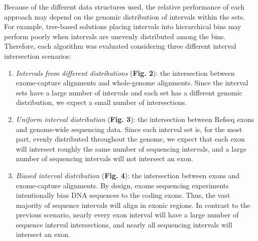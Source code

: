 \documentclass{bioinfo}
\begin{document}
	Because of the different data structures used, the relative performance of each 
	approach may depend on the genomic distribution of intervals within the sets.  For example, 
	tree-based solutions placing intervals into hierarchical bins may perform poorly when intervals are 
	unevenly distributed among the bins. Therefore, each algorithm was evaluated 
	considering three different interval intersection scenarios:

		\begin{enumerate}
			\item

			{\em Intervals from different distributions} (\textbf{Fig. 2}): the intersection between exome-capture 
			alignments and whole-genome alignments. Since the interval sets have a large number of intervals
			and each set has a different genomic distribution, we expect a small number of intersections.
			
			\item
			{\em Uniform interval distribution} (\textbf{Fig. 3}): the intersection between 
			Refseq exons and genome-wide sequencing data.  Since each interval set
			is, for the most part, evenly distributed throughout the genome, we expect 
			that each exon will intersect roughly the same number of sequencing intervals, 
			and a large number of sequencing intervals will not intersect an exon.

			\item
			{\em Biased interval distribution} (\textbf{Fig. 4}):  the intersection between exons and exome-capture
			alignments.  By design, exome sequencing experiments intentionally bias DNA sequences to the coding exons.  
			Thus, the vast majority of sequence intervals will align in exonic regions. In contrast to the previous 
			scenario, nearly every exon interval will have a large number of sequence interval intersections, and 
			nearly all sequencing intervals will intersect an exon.
		\end{enumerate}
\end{document}
